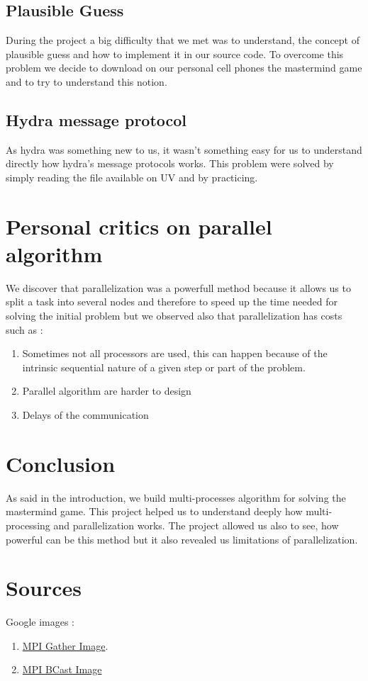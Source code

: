 \subsection{Plausible Guess}
During the project a big difficulty that we met was to understand, the concept of plausible guess and how to implement it in our source code.  To overcome this problem we decide to download on our personal cell phones the mastermind game and to try to understand this notion.
\subsection{Hydra message protocol}
As hydra was something new to us, it wasn't something easy for us to understand directly how hydra's message protocols works. This problem were solved by simply reading the file available on UV and by practicing. 


\section{Personal critics on parallel algorithm}
We discover that parallelization was a powerfull method because it allows us to split a task into several nodes and therefore to speed up the time needed for solving the initial problem but we observed also that parallelization has costs such as :
\begin{enumerate}
    \item Sometimes not all processors are used, this can happen because of the intrinsic sequential nature of a given step or part of the problem.
    \item Parallel algorithm are harder to design 
    \item Delays of the communication 
\end{enumerate}

\section{Conclusion}
As said in the introduction, we build multi-processes algorithm for solving the mastermind game. This project helped us to understand deeply how multi-processing and parallelization works. The project allowed us also to see, how powerful can be this method but it also revealed us limitations of parallelization.

\section{Sources}
Google images : 
\begin{enumerate}
    \item  \href{https://www.google.com/search?q=mpi+gather&source=lnms&tbm=isch&sa=X&ved=0ahUKEwiux-DMh5$_$fAhVQbFAKHX87DsUQ$_$AUIDigB&biw=1366&bih=695#imgrc=wk5b6Rw6eXn95M:}{MPI Gather Image}.
    
    \item \href{https://www.google.com/search?q=mpi+gather&source=lnms&tbm=isch&sa=X&ved=0ahUKEwiux
-DMh5_fAhVQbFAKHX87DsUQ_AUIDigB&biw=1366&bih=695#imgrc=WAJ80qLx2p9dvM:}{MPI BCast Image}
\end{enumerate}

